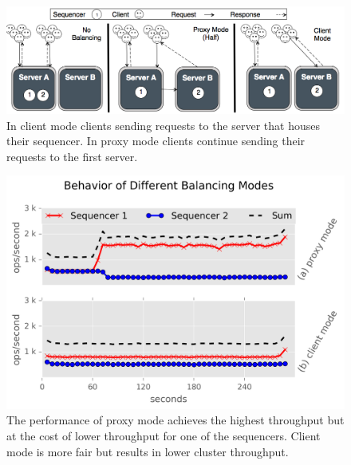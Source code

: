 \documentclass[preprint]{sigplanconf-eurosys}
\begin{document}
\begin{figure}[t!]
\centering
\includegraphics{figures/mantle-modes.png}
\caption{ In client mode clients sending requests to the server that houses
their sequencer. In proxy mode clients continue sending their requests to the
first server.  }\label{fig:mantle-modes}
\end{figure}

\begin{figure}[t!]
\centering
\includegraphics{figures/mantle-mode-behavior.png}
\caption{The performance of proxy mode achieves the highest throughput but at
the cost of lower throughput for one of the sequencers. Client mode is more
fair but results in lower cluster throughput.
}\label{fig:mantle-mode-behavior}
\end{figure}
\end{document}
